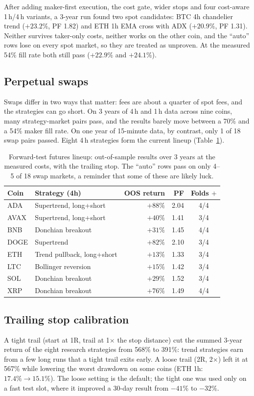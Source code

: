 \documentclass[11pt,a4paper]{article}
\begin{document}
\noindent After adding maker-first execution, the cost gate, wider stops and four cost-aware
1\,h/4\,h variants, a 3-year run found two spot candidates: BTC 4h chandelier trend ($+23.2\%$,
PF 1.82) and ETH 1h EMA cross with ADX ($+20.9\%$, PF 1.31). Neither survives taker-only costs,
neither works on the other coin, and the ``auto'' rows lose on every spot market, so they are
treated as unproven. At the measured 54\% fill rate both still pass ($+22.9\%$ and $+24.1\%$).

\subsection{Perpetual swaps}
Swaps differ in two ways that matter: fees are about a quarter of spot fees, and the strategies
can go short. On 3 years of 4\,h and 1\,h data across nine coins, many strategy-market pairs pass, and the
results barely move between a 70\% and a 54\% maker fill rate. On one year of 15-minute data,
by contrast, only 1 of 18 swap pairs passed. Eight 4\,h strategies form the current lineup
(Table~\ref{tab:lineup}).

\begin{table}[h]
\centering\small
\begin{tabular}{@{}llrrc@{}}
\toprule
Coin & Strategy (4h) & OOS return & PF & Folds $+$ \\
\midrule
ADA & Supertrend, long+short & $+88\%$ & 2.04 & 4/4 \\
AVAX & Supertrend, long+short & $+40\%$ & 1.41 & 3/4 \\
BNB & Donchian breakout & $+31\%$ & 1.45 & 4/4 \\
DOGE & Supertrend & $+82\%$ & 2.10 & 3/4 \\
ETH & Trend pullback, long+short & $+13\%$ & 1.33 & 3/4 \\
LTC & Bollinger reversion & $+15\%$ & 1.42 & 3/4 \\
SOL & Donchian breakout & $+29\%$ & 1.52 & 3/4 \\
XRP & Donchian breakout & $+76\%$ & 1.49 & 4/4 \\
\bottomrule
\end{tabular}
\caption{Forward-test futures lineup: out-of-sample results over 3 years at the measured
costs, with the trailing stop. The ``auto'' rows pass on only 4--5 of 18 swap markets,
a reminder that some of these are likely luck.}\label{tab:lineup}
\end{table}

\subsection{Trailing stop calibration}\label{sec:trail}
A tight trail (start at 1R, trail at 1$\times$ the stop distance) cut the summed 3-year return of
the eight research strategies from 568\% to 391\%: trend strategies earn from a few long runs that
a tight trail exits early. A loose trail (2R, 2$\times$) left it at 567\% while lowering the worst
drawdown on some coins (ETH 1h: $17.4\% \to 15.1\%$). The loose setting is the default; the tight
one was used only on a fast test slot, where it improved a 30-day result from $-41\%$ to $-32\%$.
\end{document}
